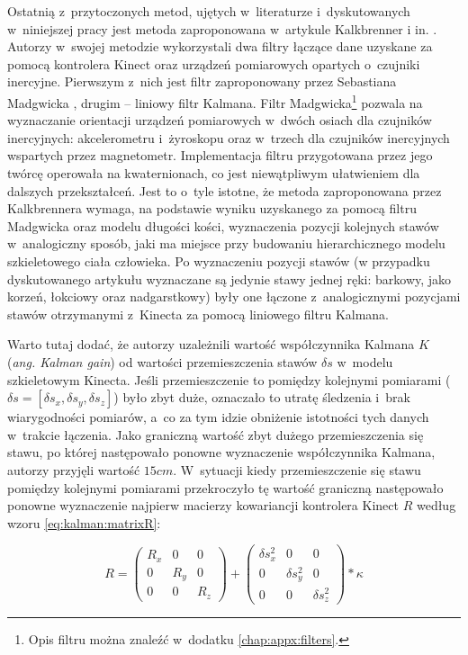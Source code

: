 Ostatnią z~przytoczonych metod, ujętych w~literaturze i~dyskutowanych w~niniejszej pracy jest metoda zaproponowana w~artykule Kalkbrenner i in. \cite{Kalkbrenner2014}. Autorzy w~swojej metodzie wykorzystali dwa filtry łączące dane uzyskane za pomocą kontrolera Kinect oraz urządzeń pomiarowych opartych o~czujniki inercyjne. Pierwszym z~nich jest filtr zaproponowany przez Sebastiana Madgwicka \cite{Kalkbrenner2014}, drugim -- liniowy filtr Kalmana. Filtr Madgwicka\footnote{Opis filtru można znaleźć w~dodatku \ref{chap:appx:filters}.} pozwala na wyznaczanie orientacji urządzeń pomiarowych w~dwóch osiach dla czujników inercyjnych: akcelerometru i~żyroskopu oraz w~trzech dla czujników inercyjnych wspartych przez magnetometr. Implementacja filtru przygotowana przez jego twórcę operowała na kwaternionach, co jest niewątpliwym ułatwieniem dla dalszych przekształceń. Jest to o~tyle istotne, że metoda zaproponowana przez Kalkbrennera wymaga, na podstawie wyniku uzyskanego za pomocą filtru Madgwicka oraz modelu długości kości, wyznaczenia pozycji kolejnych stawów  w~analogiczny sposób, jaki ma miejsce przy budowaniu hierarchicznego modelu szkieletowego ciała człowieka. Po wyznaczeniu pozycji stawów (w przypadku dyskutowanego artykułu wyznaczane są jedynie stawy jednej ręki: barkowy, jako korzeń, łokciowy oraz nadgarstkowy) były one łączone z~analogicznymi pozycjami stawów otrzymanymi z~Kinecta za pomocą liniowego filtru Kalmana.							
				
Warto tutaj dodać, że autorzy uzależnili wartość współczynnika Kalmana $K$ (\emph{ang. Kalman gain}) od wartości przemieszczenia stawów $\delta s$ w~modelu szkieletowym Kinecta. Jeśli przemieszczenie to pomiędzy kolejnymi pomiarami ($\delta s = [\delta s_x, \delta s_y, \delta s_z]$) było zbyt duże, oznaczało to utratę śledzenia i~brak wiarygodności pomiarów, a~co za tym idzie obniżenie istotności tych danych w~trakcie łączenia. Jako graniczną wartość zbyt dużego przemieszczenia się stawu, po której następowało ponowne wyznaczenie współczynnika Kalmana, autorzy przyjęli wartość $15cm$. W~sytuacji kiedy przemieszczenie się stawu pomiędzy kolejnymi pomiarami przekroczyło tę wartość graniczną następowało ponowne wyznaczenie najpierw macierzy kowariancji kontrolera Kinect $R$ według wzoru \ref{eq:kalman:matrixR}:
									
\begin{equation}
	R = 
	\begin{pmatrix}
		R_x & 0   & 0   \\
		0   & R_y & 0   \\
		0   & 0   & R_z 
	\end{pmatrix} +
	\begin{pmatrix}
		\delta s_x^2 & 0            & 0            \\
		0            & \delta s_y^2 & 0            \\
		0            & 0            & \delta s_z^2 
	\end{pmatrix} * \kappa
	\label{eq:kalman:matrixR}
\end{equation}


